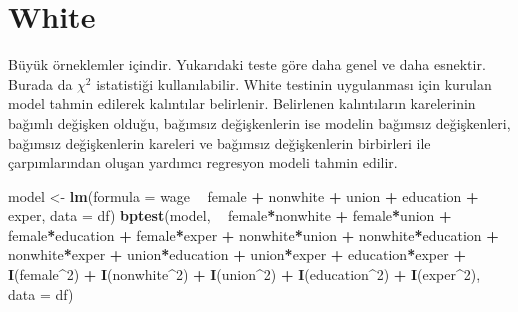 \documentclass[
]{book}
\newenvironment{Shaded}{\begin{snugshade}}{\end{snugshade}}
\newcommand{\DataTypeTok}[1]{\textcolor[rgb]{0.13,0.29,0.53}{#1}}
\newcommand{\DecValTok}[1]{\textcolor[rgb]{0.00,0.00,0.81}{#1}}
\newcommand{\KeywordTok}[1]{\textcolor[rgb]{0.13,0.29,0.53}{\textbf{#1}}}
\newcommand{\NormalTok}[1]{#1}
\newcommand{\OperatorTok}[1]{\textcolor[rgb]{0.81,0.36,0.00}{\textbf{#1}}}
\newcommand{\StringTok}[1]{\textcolor[rgb]{0.31,0.60,0.02}{#1}}
\begin{document}
\hypertarget{white}{%
\section{White}\label{white}}

Büyük örneklemler içindir. Yukarıdaki teste göre daha genel ve daha esnektir. Burada da \(\chi^2\) istatistiği kullanılabilir. White testinin uygulanması için kurulan model tahmin edilerek kalıntılar belirlenir. Belirlenen kalıntıların karelerinin bağımlı değişken olduğu, bağımsız değişkenlerin ise modelin bağımsız değişkenleri, bağımsız değişkenlerin kareleri ve bağımsız değişkenlerin birbirleri ile çarpımlarından oluşan yardımcı regresyon modeli tahmin edilir.

\begin{Shaded}
\begin{Highlighting}[]
\NormalTok{model <-}\StringTok{ }\KeywordTok{lm}\NormalTok{(}\DataTypeTok{formula =}\NormalTok{ wage }\OperatorTok{~}\StringTok{ }\NormalTok{female }\OperatorTok{+}\StringTok{ }\NormalTok{nonwhite }\OperatorTok{+}\StringTok{ }\NormalTok{union }\OperatorTok{+}\StringTok{ }\NormalTok{education }\OperatorTok{+}\StringTok{ }\NormalTok{exper, }\DataTypeTok{data =}\NormalTok{ df)}
\KeywordTok{bptest}\NormalTok{(model, }\OperatorTok{~}\StringTok{ }\NormalTok{female}\OperatorTok{*}\NormalTok{nonwhite }\OperatorTok{+}\StringTok{ }\NormalTok{female}\OperatorTok{*}\NormalTok{union }\OperatorTok{+}\StringTok{ }\NormalTok{female}\OperatorTok{*}\NormalTok{education }\OperatorTok{+}\StringTok{ }\NormalTok{female}\OperatorTok{*}\NormalTok{exper }\OperatorTok{+}\StringTok{ }\NormalTok{nonwhite}\OperatorTok{*}\NormalTok{union }\OperatorTok{+}\StringTok{ }\NormalTok{nonwhite}\OperatorTok{*}\NormalTok{education }\OperatorTok{+}\StringTok{ }\NormalTok{nonwhite}\OperatorTok{*}\NormalTok{exper }\OperatorTok{+}\StringTok{ }\NormalTok{union}\OperatorTok{*}\NormalTok{education }\OperatorTok{+}\StringTok{ }\NormalTok{union}\OperatorTok{*}\NormalTok{exper }\OperatorTok{+}\StringTok{ }\NormalTok{education}\OperatorTok{*}\NormalTok{exper }\OperatorTok{+}\StringTok{ }\KeywordTok{I}\NormalTok{(female}\OperatorTok{^}\DecValTok{2}\NormalTok{) }\OperatorTok{+}\StringTok{ }\KeywordTok{I}\NormalTok{(nonwhite}\OperatorTok{^}\DecValTok{2}\NormalTok{) }\OperatorTok{+}\StringTok{ }\KeywordTok{I}\NormalTok{(union}\OperatorTok{^}\DecValTok{2}\NormalTok{) }\OperatorTok{+}\StringTok{ }\KeywordTok{I}\NormalTok{(education}\OperatorTok{^}\DecValTok{2}\NormalTok{) }\OperatorTok{+}\StringTok{ }\KeywordTok{I}\NormalTok{(exper}\OperatorTok{^}\DecValTok{2}\NormalTok{), }\DataTypeTok{data =}\NormalTok{ df)}
\end{Highlighting}
\end{Shaded}
\end{document}
